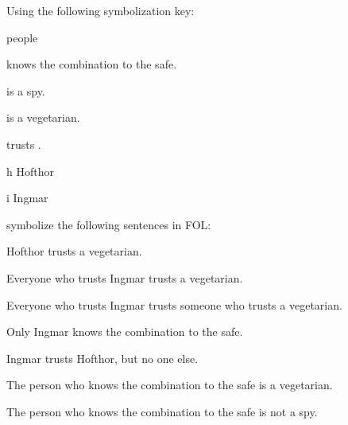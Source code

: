 \begin{practiceproblems}
\problempart
Using the following symbolization key:
\begin{ekey}
\item[\text{domain}] people
\item[\atom{K}{x}]  knows the combination to the safe.
\item[\atom{S}{x}]  is a spy.
\item[\atom{V}{x}]  is a vegetarian.
\item[\atom{T}{x,y}]  trusts .
\item[h] Hofthor
\item[i] Ingmar
\end{ekey}
symbolize the following sentences in FOL:
\begin{earg}
\item Hofthor trusts a vegetarian.
\item[] 
\item Everyone who trusts Ingmar trusts a vegetarian.
\item[] 
\item Everyone who trusts Ingmar trusts someone who trusts a vegetarian.
\item[] 
\item Only Ingmar knows the combination to the safe.
\item[] 
\item Ingmar trusts Hofthor, but no one else.
\item[] 
\item The person who knows the combination to the safe is a vegetarian.
\item[] 
\item The person who knows the combination to the safe is not a spy.
\item[] 
\end{earg}



\end{practiceproblems}
